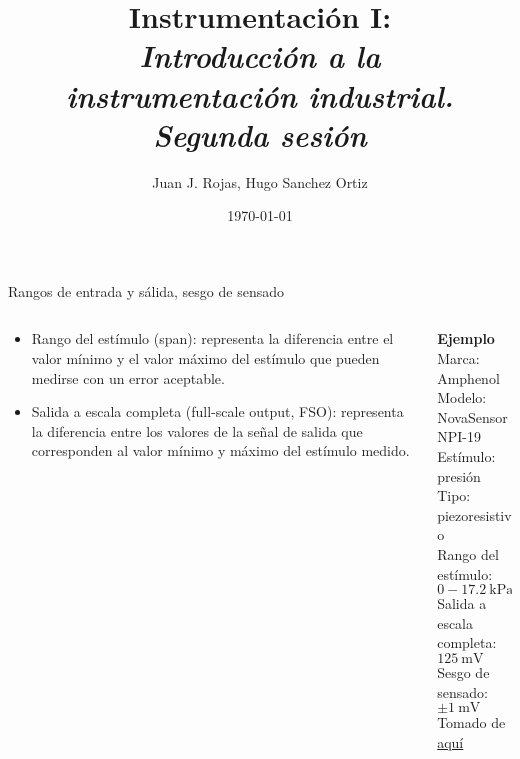 \documentclass[aspectratio=169]{beamer}
\title{Instrumentación I: \\ \emph{Introducción a la }\\ \emph{instrumentación industrial.} \\ \emph{Segunda sesión}}
\author{
    Juan J. Rojas, Hugo Sanchez Ortiz
}
\institute{Instituto Tecnológico de Costa Rica}
\date{\today}
\begin{document}

\maketitle

\newcommand{\blackandwhite}{white} %

\begin{frame}{Rangos de entrada y sálida, sesgo de sensado}
    \begin{columns}[c, onlytextwidth]
        \begin{column}{0.50\textwidth}
            \begin{itemize}
                \item Rango del estímulo (span): representa la diferencia entre el valor mínimo y el valor máximo del estímulo que pueden medirse con un error aceptable.
                \item Salida a escala completa (full-scale output, FSO): representa la diferencia entre los valores de la señal de salida que corresponden al valor mínimo y máximo del estímulo medido. 
            \end{itemize}
        \end{column}
        \begin{column}{0.45\textwidth}
            \textbf{Ejemplo}\\[4pt]
            Marca: Amphenol\\[4pt]
            Modelo: NovaSensor NPI-19\\[4pt]
            Estímulo: presión\\[4pt]
            Tipo: piezoresistivo\\[4pt]
            Rango del estímulo: $0  - \SI{17.2}{\kilo\pascal}$\\[4pt]
            Salida a escala completa: $\SI{125}{\milli\volt}$\\[4pt]
            Sesgo de sensado: $\pm \SI{1}{\milli\volt}$\\[10pt]
            \tiny{Tomado de \href{https://f.hubspotusercontent40.net/hubfs/9035299/Documents/AAS-920-298B-NovaSensor\%20NPI-19-REVISED-061714-web.pdf}{aquí}}
        \end{column}
    \end{columns}
\end{frame}
\end{document}

